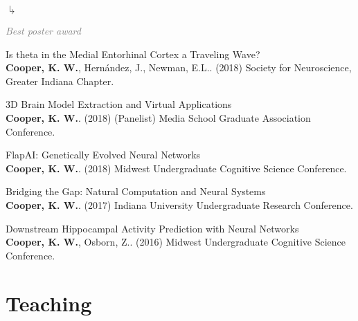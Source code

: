 \documentclass[10pt]{cooperCV2}
\begin{document}
\begin{etaremune}[itemindent=-1.5\bibhang, topsep=0pt,
				   itemsep=\bibsep,partopsep=0pt,parsep=0pt,leftmargin={\bibhang+\widthof{[999]}}]
     	\begin{list}{$\drsh$}{}
     	
	     \item  \textcolor{grey}{\textit{Best poster award} }
     	
     	\end{list}
     
	
    \item Is theta in the Medial Entorhinal Cortex a Traveling Wave?\\ \textbf{Cooper, K. W.}, Hernández, J., Newman, E.L.. (2018) Society for Neuroscience, Greater Indiana Chapter. 
     
	
    \item 3D Brain Model Extraction and Virtual Applications\\ \textbf{Cooper, K. W.}. (2018) (Panelist) Media School Graduate Association Conference. 
     
	
    \item FlapAI: Genetically Evolved Neural Networks\\ \textbf{Cooper, K. W.}. (2018) Midwest Undergraduate Cognitive Science Conference. 
     
	
    \item Bridging the Gap: Natural Computation and Neural Systems\\ \textbf{Cooper, K. W.}. (2017) Indiana University Undergraduate Research Conference. 
     
	
    \item Downstream Hippocampal Activity Prediction with Neural Networks\\ \textbf{Cooper, K. W.}, Osborn, Z.. (2016) Midwest Undergraduate Cognitive Science Conference. 
     
	


\end{etaremune}







%	






\section{Teaching}
\end{document}
